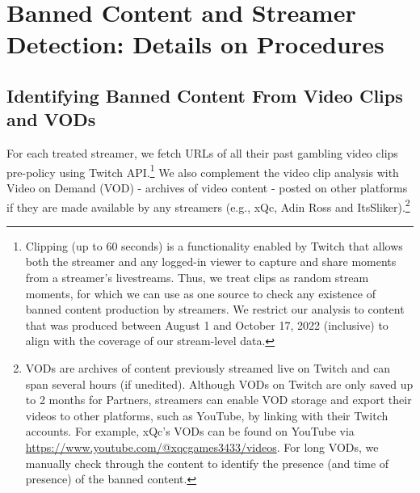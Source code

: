 \documentclass[a4paper,12pt]{article}
\begin{document}
\newpage

\section{Banned Content and Streamer Detection: Details on Procedures} \label{appendix-banned-content-detection}

\subsection{Identifying Banned Content From Video Clips and VODs} \label{appendix-treatment-detection-clips}

For each treated streamer, we fetch URLs of all their past gambling video clips pre-policy using Twitch API.\footnote{Clipping (up to 60 seconds) is a functionality enabled by Twitch that allows both the streamer and any logged-in viewer to capture and share moments from a streamer's livestreams. Thus, we treat clips as random stream moments, for which we can use as one source to check any existence of banned content production by streamers. We restrict our analysis to content that was produced between August 1 and October 17, 2022 (inclusive) to align with the coverage of our stream-level data.} We also complement the video clip analysis with Video on Demand (VOD) - archives of video content - posted on other platforms if they are made available by any streamers (e.g., xQc, Adin Ross and ItsSliker).\footnote{VODs are archives of content previously streamed live on Twitch and can span several hours (if unedited). Although VODs on Twitch are only saved up to 2 months for Partners, streamers can enable VOD storage and export their videos to other platforms, such as YouTube, by linking with their Twitch accounts. For example, xQc's VODs can be found on YouTube via \url{https://www.youtube.com/@xqcgames3433/videos}. For long VODs, we manually check through the content to identify the presence (and time of presence) of the banned content.} 
\end{document}
